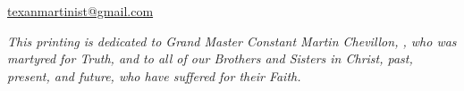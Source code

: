 \url{texanmartinist@gmail.com}

\vspace*{\fill}

\blankpage

\vspace*{\fill}
	\begin{center}\end{center}
\vspace*{3em}
\textit{This printing is dedicated to Grand Master Constant Martin Chevillon, \sigi{}, who was martyred for Truth, and to all of our Brothers and Sisters in Christ, past, present, and future, who have suffered for their Faith.}

\vspace*{\fill}

\blankpage